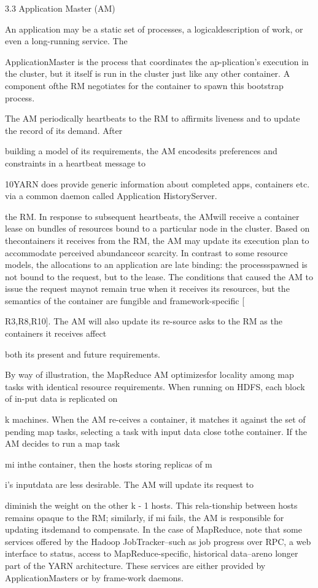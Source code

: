 3.3 Application Master (AM)

An application may be a static set of processes, a logicaldescription of work, or even a long-running service. The

ApplicationMaster is the process that coordinates the ap-plication's execution in the cluster, but it itself is run in
the cluster just like any other container. A component ofthe RM negotiates for the container to spawn this bootstrap process.

The AM periodically heartbeats to the RM to affirmits liveness and to update the record of its demand. After

building a model of its requirements, the AM encodesits preferences and constraints in a heartbeat message to

10YARN does provide generic information about completed apps,
containers etc. via a common daemon called Application HistoryServer.

the RM. In response to subsequent heartbeats, the AMwill receive a container lease on bundles of resources
bound to a particular node in the cluster. Based on thecontainers it receives from the RM, the AM may update
its execution plan to accommodate perceived abundanceor scarcity. In contrast to some resource models, the allocations to an application are late binding: the processspawned is not bound to the request, but to the lease. The
conditions that caused the AM to issue the request maynot remain true when it receives its resources, but the
semantics of the container are fungible and framework-specific [

R3,R8,R10]. The AM will also update its re-source asks to the RM as the containers it receives affect

both its present and future requirements.

By way of illustration, the MapReduce AM optimizesfor locality among map tasks with identical resource requirements. When running on HDFS, each block of in-put data is replicated on

k machines. When the AM re-ceives a container, it matches it against the set of pending map tasks, selecting a task with input data close tothe container. If the AM decides to run a map task

mi inthe container, then the hosts storing replicas of m

i's inputdata are less desirable. The AM will update its request to

diminish the weight on the other k - 1 hosts. This rela-tionship between hosts remains opaque to the RM; similarly, if mi fails, the AM is responsible for updating itsdemand to compensate. In the case of MapReduce, note
that some services offered by the Hadoop JobTracker--such as job progress over RPC, a web interface to status, access to MapReduce-specific, historical data--areno longer part of the YARN architecture. These services
are either provided by ApplicationMasters or by frame-work daemons.

